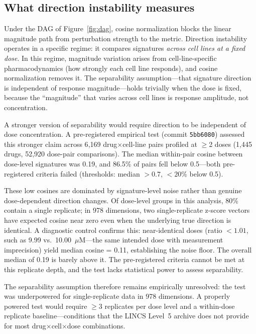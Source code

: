 \documentclass[11pt]{article}
\begin{document}
\subsection{What direction instability measures}

Under the DAG of Figure~\ref{fig:dag}, cosine normalization blocks the
linear magnitude path from perturbation strength to the metric. Direction
instability operates in a specific regime: it compares signatures
\emph{across cell lines at a fixed dose}. In this regime, magnitude
variation arises from cell-line-specific pharmacodynamics (how strongly
each cell line responds), and cosine normalization removes it. The
separability assumption---that signature direction is independent of
response magnitude---holds trivially when the dose is fixed, because
the ``magnitude'' that varies across cell lines is response amplitude,
not concentration.

A stronger version of separability would require direction to be
independent of dose concentration. A pre-registered empirical test
(commit \texttt{5bb6080}) assessed this stronger claim across 6{,}169
drug$\times$cell-line pairs profiled at $\geq$2 doses (1{,}445 drugs,
52{,}920 dose-pair comparisons). The median within-pair cosine between
dose-level signatures was 0.19, and 86.5\% of pairs fell below
0.5---both pre-registered criteria failed (thresholds: median $> 0.7$,
$< 20\%$ below 0.5).

These low cosines are dominated by signature-level noise rather than
genuine dose-dependent direction changes. Of dose-level groups in this
analysis, 80\% contain a single replicate; in 978 dimensions, two
single-replicate z-score vectors have expected cosine near zero even
when the underlying true direction is identical. A diagnostic control
confirms this: near-identical doses (ratio $< 1.01$, such as 9.99 vs.\
10.00~$\mu$M---the same intended dose with measurement imprecision)
yield median cosine = 0.11, establishing the noise floor. The overall
median of 0.19 is barely above it. The pre-registered criteria cannot
be met at this replicate depth, and the test lacks statistical power
to assess separability.

The separability assumption therefore remains empirically unresolved:
the test was underpowered for single-replicate data in 978 dimensions.
A properly powered test would require $\geq$3 replicates per dose
level and a within-dose replicate baseline---conditions that the LINCS
Level~5 archive does not provide for most drug$\times$cell$\times$dose
combinations.
\end{document}
